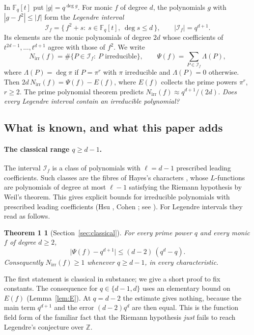 \documentclass[11pt,a4paper]{article}
\newtheorem*{theoremA}{Theorem 1}
\theoremstyle{definition}
\theoremstyle{remark}
\newcommand{\Fq}{\mathbb{F}_q}
\newcommand{\Nirr}{N_{\mathrm{irr}}}
\newcommand{\cI}{\mathcal{I}}
\begin{document}
In $\Fq[t]$ put $|g|=q^{\deg g}$. For monic $f$ of degree $d$, the polynomials $g$ with
$|g-f^2|\le|f|$ form the \emph{Legendre interval}
\[
  \cI_f=\{\,f^2+s:\ s\in\Fq[t],\ \deg s\le d\,\},\qquad |\cI_f|=q^{d+1}.
\]
Its elements are the monic polynomials of degree $2d$ whose coefficients of
$t^{2d-1},\dots,t^{d+1}$ agree with those of $f^2$. We write
\[
  \Nirr(f)=\#\{P\in\cI_f:\ P\text{ irreducible}\},\qquad
  \Psi(f)=\sum_{P\in\cI_f}\Lambda(P),
\]
where $\Lambda(P)=\deg\pi$ if $P=\pi^r$ with $\pi$ irreducible and $\Lambda(P)=0$ otherwise.
Then $2d\,\Nirr(f)=\Psi(f)-E(f)$, where $E(f)$ collects the prime powers $\pi^r$, $r\ge2$.
The prime polynomial theorem predicts $\Nirr(f)\approx q^{d+1}/(2d)$.
\emph{Does every Legendre interval contain an irreducible polynomial?}

\subsection{What is known, and what this paper adds}

\paragraph{The classical range $q\ge d-1$.}
The interval $\cI_f$ is a class of polynomials with $\ell=d-1$ prescribed leading coefficients.
Such classes are the fibres of Hayes's characters \cite{Hayes1965}, whose $L$-functions are
polynomials of degree at most $\ell-1$ satisfying the Riemann hypothesis by Weil's theorem.
This gives explicit bounds for irreducible polynomials with prescribed leading coefficients
(Hsu \cite{Hsu1996}, Cohen \cite[Thm.~2.1]{Cohen2005}; see \cite[Cors.~1--2]{Gao2021}).
For Legendre intervals they read as follows.

\begin{theoremA}[Section~\ref{sec:classical}]
For every prime power $q$ and every monic $f$ of degree $d\ge2$,
\[
  \bigl|\Psi(f)-q^{d+1}\bigr|\le(d-2)\,(q^d-q).
\]
Consequently $\Nirr(f)\ge1$ whenever $q\ge d-1$, in every characteristic.
\end{theoremA}

The first statement is classical in substance; we give a short proof to fix constants.
The consequence for $q\in\{d-1,d\}$ uses an elementary bound on $E(f)$ (Lemma~\ref{lem:E}).
At $q=d-2$ the estimate gives nothing, because the main term $q^{d+1}$ and the error
$(d-2)q^d$ are then equal. This is the function field form of the familiar fact that the
Riemann hypothesis \emph{just} fails to reach Legendre's conjecture over $\mathbb Z$.
\end{document}
